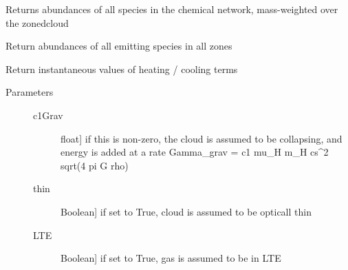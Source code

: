 \documentclass[letterpaper,10pt,english]{sphinxmanual}
\begin{document}
\begin{fulllineitems}
\begin{fulllineitems}
\begin{description}
\end{description}

\end{fulllineitems}


\begin{fulllineitems}
\label{fulldoc:despotic.zonedcloud.chemabundances}
Returns abundances of all species in the chemical network,
mass-weighted over the zonedcloud

\end{fulllineitems}


\begin{fulllineitems}
\label{fulldoc:despotic.zonedcloud.chemabundances_zone}
Return abundances of all emitting species in all zones

\end{fulllineitems}


\begin{fulllineitems}
\label{fulldoc:despotic.zonedcloud.dEdt}
Return instantaneous values of heating / cooling terms
\begin{description}
\item[{Parameters}] \leavevmode\begin{description}
\item[{c1Grav}] \leavevmode{[}float{]}
if this is non-zero, the cloud is assumed to be
collapsing, and energy is added at a rate
Gamma\_grav = c1 mu\_H m\_H cs\textasciicircum{}2 sqrt(4 pi G rho)

\item[{thin}] \leavevmode{[}Boolean{]}
if set to True, cloud is assumed to be opticall thin

\item[{LTE}] \leavevmode{[}Boolean{]}
if set to True, gas is assumed to be in LTE


\end{description}
\end{description}
\end{fulllineitems}
\end{fulllineitems}
\end{document}
